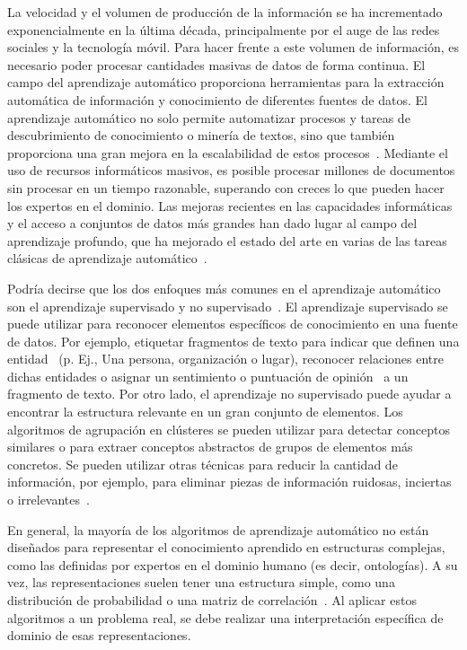 La velocidad y el volumen de producción de la información se ha incrementado exponencialmente en la última década, principalmente por el auge de las redes sociales y la tecnología móvil. Para hacer frente a este volumen de información, es necesario poder procesar cantidades masivas de datos de forma continua. El campo del aprendizaje automático proporciona herramientas para la extracción automática de información y conocimiento de diferentes fuentes de datos. El aprendizaje automático no solo permite automatizar procesos y tareas de descubrimiento de conocimiento o minería de textos, sino que también proporciona una gran mejora en la escalabilidad de estos procesos~\cite{wu2014data}. Mediante el uso de recursos informáticos masivos, es posible procesar millones de documentos sin procesar en un tiempo razonable, superando con creces lo que pueden hacer los expertos en el dominio. Las mejoras recientes en las capacidades informáticas y el acceso a conjuntos de datos más grandes han dado lugar al campo del aprendizaje profundo, que ha mejorado el estado del arte en varias de las tareas clásicas de aprendizaje automático~\cite{lecun2015deep}.

Podría decirse que los dos enfoques más comunes en el aprendizaje automático son el aprendizaje supervisado y no supervisado~\cite{kevin2012machine}. El aprendizaje supervisado se puede utilizar para reconocer elementos específicos de conocimiento en una fuente de datos. Por ejemplo, etiquetar fragmentos de texto para indicar que definen una entidad~\cite{nadeau2007survey} (p. Ej., Una persona, organización o lugar), reconocer relaciones entre dichas entidades o asignar un sentimiento o puntuación de opinión~\cite{liu2012sentiment } a un fragmento de texto. Por otro lado, el aprendizaje no supervisado puede ayudar a encontrar la estructura relevante en un gran conjunto de elementos. Los algoritmos de agrupación en clústeres se pueden utilizar para detectar conceptos similares o para extraer conceptos abstractos de grupos de elementos más concretos. Se pueden utilizar otras técnicas para reducir la cantidad de información, por ejemplo, para eliminar piezas de información ruidosas, inciertas o irrelevantes~\cite{bingham2001random}.

En general, la mayoría de los algoritmos de aprendizaje automático no están diseñados para representar el conocimiento aprendido en estructuras complejas, como las definidas por expertos en el dominio humano (es decir, ontologías). A su vez, las representaciones suelen tener una estructura simple, como una distribución de probabilidad o una matriz de correlación~\cite{bengio2013representation}. Al aplicar estos algoritmos a un problema real, se debe realizar una interpretación específica de dominio de esas representaciones.

